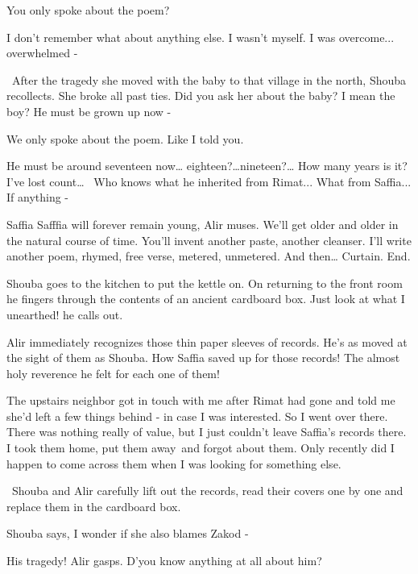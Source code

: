 \documentclass[letterpaper]{article}
\begin{document}
{\textquotedbl}You only spoke about the poem?{\textquotedbl} 

{\textquotedbl}I don't remember what about anything else. I wasn't myself. I was overcome... overwhelmed
-{\textquotedbl} 

~{\textquotedbl}After the tragedy she moved with the baby to that village in the north,{\textquotedbl} Shouba
recollects. {\textquotedbl}She broke all past ties. Did you ask her about the baby? I mean the boy? He must be grown up
now - {\textquotedbl} 

{\textquotedbl}We only spoke about the poem. Like I told you.{\textquotedbl} 

{\textquotedbl}He must be around seventeen now{\dots} eighteen?{\dots}nineteen?{\dots} How many years is it? I've lost
count{\dots} ~Who knows what he inherited from Rimat... What from Saffia... If anything -{\textquotedbl} 

{\textquotedbl}Saffia Safffia will forever remain young,{\textquotedbl} Alir muses. {\textquotedbl}We'll get older and
older in the natural course of time. You'll invent another paste, another cleanser. I'll write another poem, rhymed,
free verse, metered, unmetered. And then{\dots} Curtain. End.{\textquotedbl}

Shouba goes to the kitchen to put the kettle on. On returning to the front room he fingers through the contents of an
ancient cardboard box. {\textquotedbl}Just look at what I unearthed!{\textquotedbl} he calls out.

Alir immediately recognizes those thin paper sleeves of records. He's as moved at the sight of them as Shouba.
{\textquotedbl}How Saffia saved up for those records! The almost holy reverence he felt for each one of
them!{\textquotedbl} 

{\textquotedbl}The upstairs neighbor got in touch with me after Rimat had gone and told me she'd left a few things
behind - in case I was interested. So I went over there. There was nothing really of value, but I just couldn't leave
Saffia's records there. I took them home, put them away~and forgot about them. Only recently did I happen to come
across them when I was looking for something else.{\textquotedbl}

~Shouba and Alir carefully lift out the records, read their covers one by one and replace them in the cardboard box. 

Shouba says, {\textquotedbl}I wonder if she also blames Zakod -{\textquotedbl} 

{\textquotedbl}His tragedy!{\textquotedbl} Alir gasps. {\textquotedbl}D'you know anything at all about
him?{\textquotedbl} 
\end{document}
